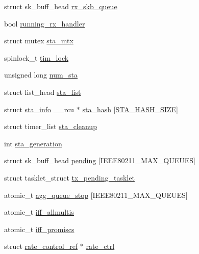 \begin{DoxyCompactItemize}
\item 
struct sk\-\_\-buff\-\_\-head \hyperlink{structieee80211__local_aac644577fe51ca03388b580ee634c471}{rx\-\_\-skb\-\_\-queue}
\item 
bool \hyperlink{structieee80211__local_a52eb7e26fdfb1a3b6469728a7131fe80}{running\-\_\-rx\-\_\-handler}
\item 
struct mutex \hyperlink{structieee80211__local_a8fb5b2a5fbdd771e5d8cbd9e6f3f0652}{sta\-\_\-mtx}
\item 
spinlock\-\_\-t \hyperlink{structieee80211__local_a66f27f63b02e43a76482968cf728de10}{tim\-\_\-lock}
\item 
unsigned long \hyperlink{structieee80211__local_a24328b32806c8eb5a960e0ed36a4b4f3}{num\-\_\-sta}
\item 
struct list\-\_\-head \hyperlink{structieee80211__local_aa442db3b90ab8934df91ba31e7602e66}{sta\-\_\-list}
\item 
struct \hyperlink{structsta__info}{sta\-\_\-info} \-\_\-\-\_\-rcu $\ast$ \hyperlink{structieee80211__local_a6014b1885979a210472e849167192cec}{sta\-\_\-hash} \mbox{[}\hyperlink{sta__info_8h_ae6a569f0acda8f25b206cbce1dd162e4}{S\-T\-A\-\_\-\-H\-A\-S\-H\-\_\-\-S\-I\-Z\-E}\mbox{]}
\item 
struct timer\-\_\-list \hyperlink{structieee80211__local_a08ed23f945556f2425951c67c8676a06}{sta\-\_\-cleanup}
\item 
int \hyperlink{structieee80211__local_a97ee12a47f59b1e2ffa51cca68a70304}{sta\-\_\-generation}
\item 
struct sk\-\_\-buff\-\_\-head \hyperlink{structieee80211__local_a1af46fe8e85323cc129ada2186925c51}{pending} \mbox{[}I\-E\-E\-E80211\-\_\-\-M\-A\-X\-\_\-\-Q\-U\-E\-U\-E\-S\mbox{]}
\item 
struct tasklet\-\_\-struct \hyperlink{structieee80211__local_aebdf516672c673478395a1f1a1bda6ab}{tx\-\_\-pending\-\_\-tasklet}
\item 
atomic\-\_\-t \hyperlink{structieee80211__local_a761ac48dbd4f02cca627bf2164691129}{agg\-\_\-queue\-\_\-stop} \mbox{[}I\-E\-E\-E80211\-\_\-\-M\-A\-X\-\_\-\-Q\-U\-E\-U\-E\-S\mbox{]}
\item 
atomic\-\_\-t \hyperlink{structieee80211__local_ad49cfc0bfcbcee0e8082e1b209e97d31}{iff\-\_\-allmultis}
\item 
atomic\-\_\-t \hyperlink{structieee80211__local_a8f1cf23044f197295b99eb923325e33b}{iff\-\_\-promiscs}
\item 
struct \hyperlink{structrate__control__ref}{rate\-\_\-control\-\_\-ref} $\ast$ \hyperlink{structieee80211__local_a0f6ac21a75ada1908328210ec3b42667}{rate\-\_\-ctrl}

\end{DoxyCompactItemize}

